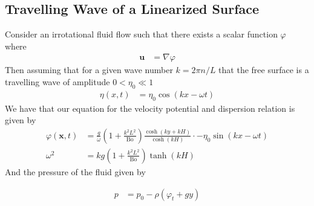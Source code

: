 \subsection{Travelling Wave of a Linearized Surface} \label{sec:travelling_wave_linear_surface}
Consider an irrotational fluid flow such that there exists a scalar function $\varphi$ where
\begin{align} \label{eq:VelocityPotentialDefinition}
	\mathbf u &= \nabla \varphi
\end{align}
Then assuming that for a given wave number $k = 2 \pi n / L$ that the free surface is a travelling wave of amplitude $0 < \eta_0 \ll 1$
\begin{align} \label{eq:FreeSurface}
	\eta(x, t) &= \eta_0 \cos(kx - \omega t)
\end{align}
We have that our equation for the velocity potential and dispersion relation is given by
\begin{subequations}
\begin{align} \label{eq:FreeSurfaceEquations}
	\varphi(\mathbf x, t) &= \frac{g}{ \omega } \left( 1 + \frac{k^2L^2}{\text{Bo}} \right) \frac{ \cosh( ky + kH) }{ \cosh(kH) } \cdot - \eta_0 \sin(kx - \omega t) \\
	\omega^2 &= kg \left( 1 + \frac{k^2 L^2} {\text{Bo}}  \right) \tanh( kH )
\end{align}
\end{subequations}
And the pressure of the fluid given by

\begin{align} \label{eq:Pressure}
	p &= p_0 - \rho ( \varphi_t + g y)
\end{align}

